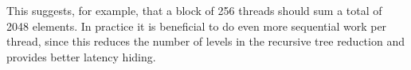 This suggests, for example, that a block of 256 threads should sum a total of
2048 elements. In practice it is beneficial to do even more sequential work per
thread, since this reduces the number of levels in the recursive tree reduction
and provides better latency hiding.



%
